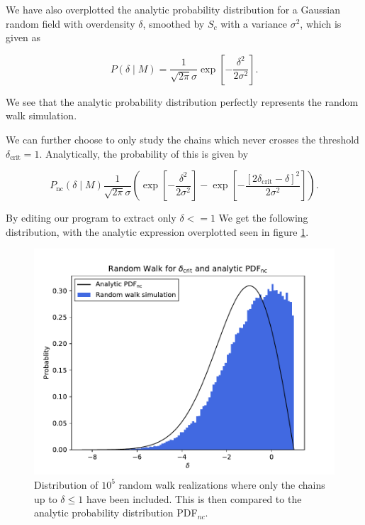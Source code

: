 \documentclass[a4paper,10pt]{article}
\begin{document}
\noindent We have also overplotted the analytic probability distribution for a Gaussian random field with overdensity $\delta$, smoothed by $S_c$ with a variance $\sigma^2$, which is given as

\begin{equation}\label{eq:8}
    P(\delta \mid M) = \frac{1}{\sqrt{2\pi}\sigma} \exp\left[ - \frac{\delta^2}{2\sigma^2} \right].
\end{equation}

\noindent We see that the analytic probability distribution perfectly represents the random walk simulation.

\newpage 

We can further choose to only study the chains which never crosses the threshold $\delta_\text{crit} = 1$. Analytically, the probability of this is given by

\begin{equation}\label{eq:9}
    P_\text{nc}(\delta \mid M) \frac{1}{\sqrt{2\pi}\sigma}\left( \exp\left[ - \frac{\delta^2}{2\sigma^2} \right] - \exp \left[ - \frac{[2\delta_\text{crit} - \delta]^2}{2\sigma^2} \right] \right).
\end{equation}

By editing our program to extract only $\delta <= 1$ We get the following distribution, with the analytic expression overplotted seen in figure \ref{fig:3}.

\begin{figure}[h]
    \centering
    \includegraphics[width=0.8\linewidth]{Figures/randomcritwalk.pdf}
    \caption{Distribution of $10^5$ random walk realizations where only the chains up to $\delta \leq 1$ have been included. This is then compared to the analytic probability distribution PDF$_{nc}$.}
    \label{fig:3}
\end{figure}
\end{document}
